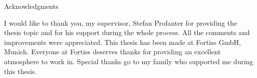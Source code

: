 \thispagestyle{empty}

\vspace*{20mm}

\begin{center}
{ Acknowledgments}
\end{center}

\vspace{10mm}




I would like to thank you, my supervisor, Stefan Profanter for providing the thesis topic and for his support during the whole process.  All the comments and improvements were appreciated. This thesis has been made at Fortiss GmbH, Munich. Everyone at
Fortiss deserves thanks for providing an excellent atmosphere to work in.  Special thanks go to my family who supported me during this thesis.

\cleardoublepage{}
